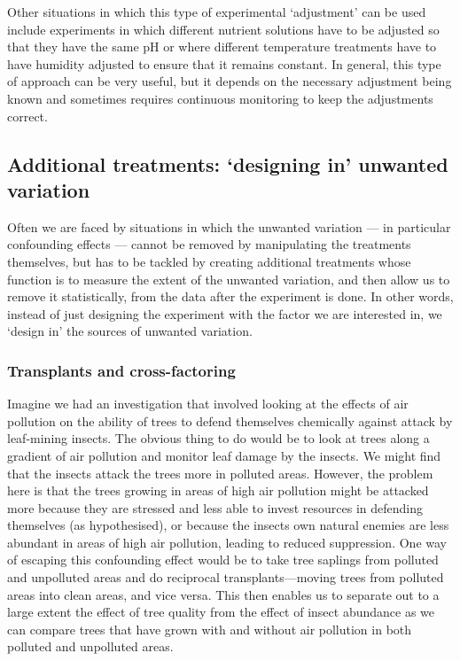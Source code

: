 \documentclass[
]{book}
\begin{document}
Other situations in which this type of experimental `adjustment' can be used include experiments in which different nutrient solutions have to be adjusted so that they have the same pH or where different temperature treatments have to have humidity adjusted to ensure that it remains constant. In general, this type of approach can be very useful, but it depends on the necessary adjustment being known and sometimes requires continuous monitoring to keep the adjustments correct.

\hypertarget{additional-treatments-designing-in-unwanted-variation}{%
\subsection{Additional treatments: `designing in' unwanted variation}\label{additional-treatments-designing-in-unwanted-variation}}

Often we are faced by situations in which the unwanted variation --- in particular confounding effects --- cannot be removed by manipulating the treatments themselves, but has to be tackled by creating additional treatments whose function is to measure the extent of the unwanted variation, and then allow us to remove it statistically, from the data after the experiment is done. In other words, instead of just designing the experiment with the factor we are interested in, we `design in' the sources of unwanted variation.

\hypertarget{transplants-and-cross-factoring}{%
\subsubsection{Transplants and cross-factoring}\label{transplants-and-cross-factoring}}

Imagine we had an investigation that involved looking at the effects of air pollution on the ability of trees to defend themselves chemically against attack by leaf-mining insects. The obvious thing to do would be to look at trees along a gradient of air pollution and monitor leaf damage by the insects. We might find that the insects attack the trees more in polluted areas. However, the problem here is that the trees growing in areas of high air pollution might be attacked more because they are stressed and less able to invest resources in defending themselves (as hypothesised), or because the insects own natural enemies are less abundant in areas of high air pollution, leading to reduced suppression. One way of escaping this confounding effect would be to take tree saplings from polluted and unpolluted areas and do reciprocal transplants---moving trees from polluted areas into clean areas, and vice versa. This then enables us to separate out to a large extent the effect of tree quality from the effect of insect abundance as we can compare trees that have grown with and without air pollution in both polluted and unpolluted areas.
\end{document}
